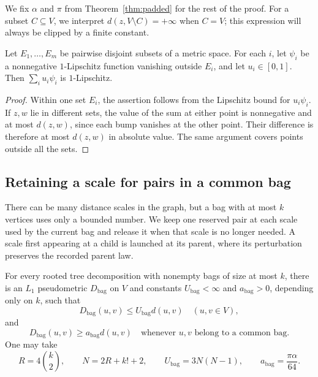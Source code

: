 We fix $\alpha$ and $\pi$ from Theorem~\ref{thm:padded} for the rest of
the proof. For a subset $C\subseteq V$, we interpret
$d(z,V\setminus C)=+\infty$ when $C=V$; this expression will always be
clipped by a finite constant.

\begin{lemma}\label{lem:disjoint-bumps}
Let $E_1,\ldots,E_m$ be pairwise disjoint subsets of a metric space.
For each $i$, let $\psi_i$ be a nonnegative $1$-Lipschitz function
vanishing outside $E_i$, and let $u_i\in[0,1]$. Then
$\sum_i u_i\psi_i$ is $1$-Lipschitz.
\end{lemma}

\begin{proof}
Within one set $E_i$, the assertion follows from the Lipschitz bound
for $u_i\psi_i$. If $z,w$ lie in different sets, the value of the sum
at either point is nonnegative and at most $d(z,w)$, since each bump
vanishes at the other point. Their difference is therefore at most
$d(z,w)$ in absolute value. The same argument covers points outside
all the sets.
\end{proof}

\subsection{Retaining a scale for pairs in a common bag}

There can be many distance scales in the graph, but a bag with at most
$k$ vertices uses only a bounded number. We keep one reserved pair at
each scale used by the current bag and release it when that scale is
no longer needed. A scale first appearing at a child is launched at
its parent, where its perturbation preserves the recorded parent law.

\begin{samepage}
\begin{proposition}\label{prop:cobag}
For every rooted tree decomposition with nonempty bags of size at most $k$, there is
an $L_1$ pseudometric $D_{\mathrm{bag}}$ on $V$ and constants
$U_{\mathrm{bag}}<\infty$ and $a_{\mathrm{bag}}>0$, depending only on
$k$, such that
\[
  D_{\mathrm{bag}}(u,v)\leq U_{\mathrm{bag}}d(u,v)
       \quad(u,v\in V),
\]
and
\[
  D_{\mathrm{bag}}(u,v)\geq a_{\mathrm{bag}}d(u,v)
       \quad\text{whenever $u,v$ belong to a common bag}.
\]
One may take
\[
  R=4\binom{k}{2},\qquad N=2R+k!+2,\qquad
  U_{\mathrm{bag}}=3N(N-1),\qquad
  a_{\mathrm{bag}}=\frac{\pi\alpha}{64}.
\]
\end{proposition}
\end{samepage}

